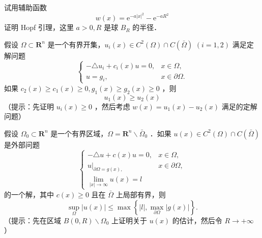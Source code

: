 \documentclass{mynote}
\begin{document}
\begin{exercise}
    试用辅助函数
$$
w(x)=\mathrm{e}^{-a|x|^2}-\mathrm{e}^{-a R^2}
$$
证明 Hopf 引理，这里 $a>0, R$ 是球 $B_R$ 的半径．
\end{exercise}

\begin{exercise}
    假设 $\Omega \subset \mathbf{R}^n$ 是一个有界开集，$u_i(x) \in C^2(\Omega) \cap C(\bar{\Omega})$ $(i=1,2)$ 满足定解问题
$$
\begin{cases}-\triangle u_i+c_i(x) u=0, & x \in \Omega, \\ u=g_i, & x \in \partial \Omega .\end{cases}
$$
如果 $c_2(x) \geq c_1(x) \geq 0, g_1(x) \geq g_2(x) \geq 0$ ，则
$$
u_1(x) \geq u_2(x)
$$
（提示：先证明 $u_i(x) \geq 0$ ，然后考虑 $w(x)=u_1(x)-u_2(x)$ 满足的定解问题）
\end{exercise}


\begin{exercise}
    假设 $\Omega_0 \subset \mathbf{R}^n$ 是一个有界区域，$\Omega=\mathbf{R}^n \backslash \bar{\Omega}_0$ ．如果 $u(x) \in C^2(\Omega) \cap C(\bar{\Omega})$ 是外部问题
$$
\begin{cases}-\triangle u+c(x) u=0, & x \in \Omega, \\ \left.u\right|_{\partial \Omega=g(x),} & x \in \partial \Omega, \\ \lim _{|x| \rightarrow \infty} u(x)=l & \end{cases}
$$
的一个解，其中 $c(x) \geq 0$ 且在 $\bar{\Omega}$ 上局部有界，则
$$
\sup _{\Omega}|u(x)| \leq \max \left\{|l|, \max _{\partial \Omega}|g(x)|\right\} .
$$
（提示：先在区域 $B(0, R) \backslash \Omega_0$ 上证明关于 $u(x)$ 的估计，然后令 $R \rightarrow +\infty$）
\end{exercise}
\end{document}

